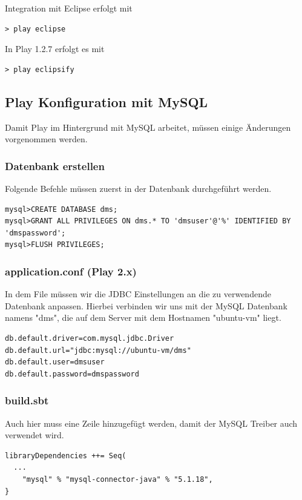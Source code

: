 \documentclass[11pt, a4paper]{article}
\begin{document}
Integration mit Eclipse erfolgt mit 

\begin{lstlisting}
> play eclipse
\end{lstlisting}

In Play 1.2.7 erfolgt es mit

\begin{lstlisting}
> play eclipsify
\end{lstlisting}

\subsection{Play Konfiguration mit MySQL}

Damit Play im Hintergrund mit MySQL arbeitet, müssen einige Änderungen vorgenommen werden.

\subsubsection*{Datenbank erstellen}

Folgende Befehle müssen zuerst in der Datenbank durchgeführt werden.

\begin{lstlisting}
mysql>CREATE DATABASE dms;
mysql>GRANT ALL PRIVILEGES ON dms.* TO 'dmsuser'@'%' IDENTIFIED BY 'dmspassword';
mysql>FLUSH PRIVILEGES;\end{lstlisting}

\subsubsection*{application.conf (Play 2.x)}

In dem File müssen wir die JDBC Einstellungen an die zu verwendende Datenbank anpassen. Hierbei verbinden wir uns mit der MySQL Datenbank namens "dms", die auf dem Server mit dem Hostnamen "ubuntu-vm" liegt. 

\begin{lstlisting}
db.default.driver=com.mysql.jdbc.Driver
db.default.url="jdbc:mysql://ubuntu-vm/dms"
db.default.user=dmsuser
db.default.password=dmspassword\end{lstlisting}

\subsubsection*{build.sbt}

Auch hier muss eine Zeile hinzugefügt werden, damit der MySQL Treiber auch verwendet wird.
\begin{lstlisting}
libraryDependencies ++= Seq(
  ...
	"mysql" % "mysql-connector-java" % "5.1.18",
}\end{lstlisting}
\end{document}
